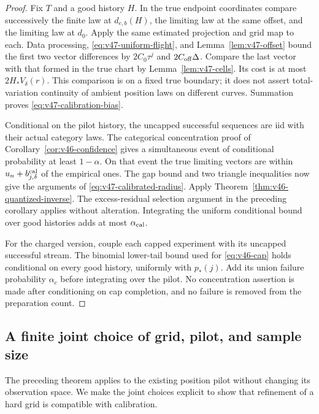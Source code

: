 \begin{proof}
Fix $T$ and a good history $H$.  In the true endpoint coordinates compare
successively the finite law at $d_{e,b}(H)$, the limiting law at the same
offset, and the limiting law at $d_0$.  Apply the same estimated projection
and grid map to each.  Data processing, \eqref{eq:v47-uniform-flight}, and
Lemma~\ref{lem:v47-offset} bound the first two vector differences by
$2C_0\tau^j$ and $2C_{\rm off}\Delta$.  Compare the last vector with
that formed in the true chart by Lemma~\ref{lem:v47-cells}.  Its cost is
at most $2H_*V_\delta(r)$.  This comparison is on a fixed true boundary;
it does not assert total-variation continuity of ambient position laws
on different curves.  Summation proves \eqref{eq:v47-calibration-bias}.

Conditional on the pilot history, the uncapped successful sequences are
iid with their actual category laws.  The categorical concentration proof
of Corollary~\ref{cor:v46-confidence} gives a simultaneous event of
conditional probability at least $1-\alpha$.  On that event the true
limiting vectors are within $u_n+b^{\rm cal}_{j,\delta}$ of the empirical
ones.  The gap bound and two triangle inequalities now give the arguments
of \eqref{eq:v47-calibrated-radius}.  Apply
Theorem~\ref{thm:v46-quantized-inverse}.  The excess-residual selection
argument in the preceding corollary applies without alteration.
Integrating the uniform conditional bound over good histories adds at most
$\alpha_{\rm cal}$.

For the charged version, couple each capped experiment with its uncapped
successful stream.  The binomial lower-tail bound used for
\eqref{eq:v46-cap} holds conditional on every good history, uniformly with
$p_*(j)$.  Add its union failure probability $\alpha_c$ before integrating
over the pilot.  No concentration assertion is made after conditioning on
cap completion, and no failure is removed from the preparation count.
\end{proof}

\subsection{A finite joint choice of grid, pilot, and sample size}

The preceding theorem applies to the existing position pilot without
changing its observation space.  We make the joint choices explicit to
show that refinement of a hard grid is compatible with calibration.


